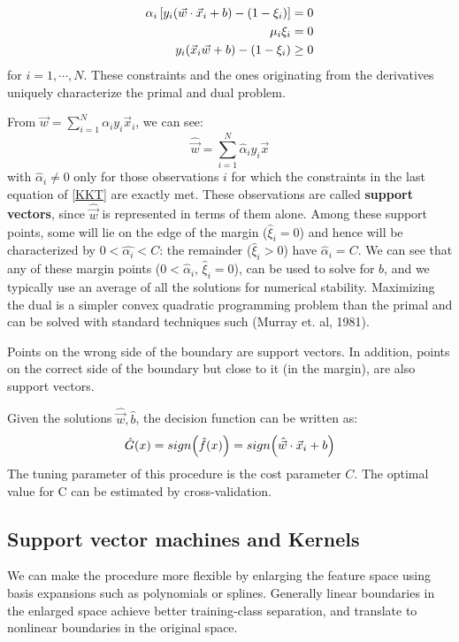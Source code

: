 \begin{equation}
\begin{aligned}
\alpha_i \left[ y_i\br{\vec{w}\cdot\vec{x}_i+b}-\br{1-\xi_i}\right] &=0\\
\mu_i \xi_i &= 0\\
y_i(\vec{x}_i\vec{w}+b) - (1 - \xi_i) &\ge 0
\end{aligned}
\label{KKT}
\end{equation}
for $i=1,\cdots, N$. These constraints and the ones originating from the derivatives uniquely characterize the primal and dual problem.

From $\vec{w} = \sum_{i=1}^N  \alpha_i y_i \vec{x}_i$, we can see:
\begin{equation}
\hat{\vec{w}} = \sum_{i=1}^N \hat{\alpha}_i y_i \vec{x}
\end{equation}
with $\hat{\alpha}_i \ne 0$ only for those observations $i$ for which the constraints in the last equation of \autoref{KKT} are exactly met. These observations are called \textbf{support vectors}, since $\hat{\vec{w}}$ is represented in terms of them alone. Among these support points, some will lie on the edge of the margin ($\hat{\xi}_i=0$) and hence will be characterized by $0 < \hat{\alpha_i} <C$: the remainder ($\hat{\xi}_i>0$) have $\hat{\alpha}_i=C$. We can see that any of these margin points ($0<\hat{\alpha}_i$, $\hat{\xi}_i = 0$), can be used to solve for $b$, and we typically use an average of all the solutions for numerical stability. Maximizing the dual is a simpler convex quadratic programming problem than the primal and can be solved with standard techniques such (Murray et. al, 1981).

Points on the wrong side of the boundary are support vectors. In addition, points on the correct side of the boundary but close to it (in the margin), are also support vectors. 

Given the solutions $\hat{\vec{w}}, \hat{b}$, the decision function can be written as:
\begin{equation}
\hat{G} (x) = sign \br{\hat{f}(x)}= sign\br{\hat{\vec{w}}\cdot \vec{x}_i+b}
\end{equation}
The tuning parameter of this procedure is the cost parameter $C$. The optimal value for C can be estimated by cross-validation.
\subsection{Support vector machines and Kernels}
We can make the procedure more flexible by enlarging the feature space using basis expansions such as polynomials or splines. Generally linear boundaries in the enlarged space achieve better training-class separation, and translate to nonlinear boundaries in the original space. 

